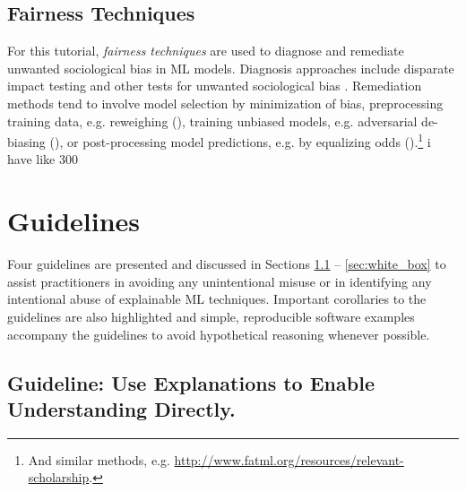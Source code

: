 \documentclass[sigconf]{acmart}
\begin{document}
\subsection{Fairness Techniques}

For this tutorial, \textit{fairness techniques} are used to diagnose and remediate unwanted sociological bias in ML models. Diagnosis approaches include disparate impact testing and other tests for unwanted sociological bias \cite{feldman2015certifying}. Remediation methods tend to involve model selection by minimization of bias, preprocessing training data, e.g. reweighing (\citet{kamiran2012data}), training unbiased models, e.g. adversarial de-biasing (\citet{zhang2018mitigating}), or post-processing model predictions, e.g. by equalizing odds (\citet{hardt2016equality}).\footnote{And similar methods, e.g. \url{http://www.fatml.org/resources/relevant-scholarship}.} 
i have like 300
\section{Guidelines}

Four guidelines are presented and discussed in Sections \ref{sec:trust} -- \ref{sec:white_box} to assist practitioners in avoiding any unintentional misuse or in identifying any intentional abuse of explainable ML techniques. Important corollaries to the guidelines are also highlighted and simple, reproducible software examples accompany the guidelines to avoid hypothetical reasoning whenever possible. 

\subsection{Guideline: Use Explanations to Enable Understanding Directly.} \label{sec:trust}
\end{document}
